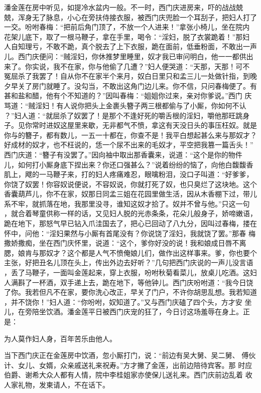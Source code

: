 潘金莲在房中听见，如提冷水盆内一般。不一时，西门庆进房来，吓的战战兢
兢，浑身无了脉息，小心在旁扶侍接衣服，被西门庆兜脸一个耳刮子，把妇人打了
一交。吩咐春梅：“把前后角门顶了，不放一个人进来！”拿张小椅儿，坐在院内
花架儿底下，取了一根马鞭子，拿在手里，喝令：“淫妇，脱了衣裳跪着！”那妇
人自知理亏，不敢不跪，真个脱去了上下衣服，跪在面前，低垂粉面，不敢出一声
儿。西门庆便问：“贼淫妇，你休推梦里睡里，奴才我已审问明白，他一一都供出
来了。你实说，我不在家，你与他偷了几遭？”妇人便哭道：“天那，天那！可不
冤屈杀了我罢了！自从你不在家半个来月，奴白日里只和孟三儿一处做针指，到晚
夕早关了房门就睡了。没勾当，不敢出这角门边儿来。你不信，只问春梅便了。有
甚和盐和醋，他有个不知道的？”因叫春梅：“姐姐你过来，亲对你爹说。”西门
庆骂道：“贼淫妇！有人说你把头上金裹头簪子两三根都偷与了小厮，你如何不认
？”妇人道：“就屈杀了奴罢了！是那个不逢好死的嚼舌根的淫妇，嚼他那旺跳身
子。见你常时进奴这屋里来歇，无非都气不愤，拿这有天没日头的事压枉奴。就是
你与的簪子，都有数儿，一五一十都在，你查不是！我平白想起甚么来与那奴才？
好成材的奴才，也不枉说的，恁一个尿不出来的毛奴才，平空把我篡一篇舌头！”
西门庆道：“簪子有没罢了。”因向袖中取出那香囊来，说道：“这个是你的物件
儿，如何打小厮身底下捏出来？你还口强甚么？”说着纷纷的恼了，向他白馥馥香
肌上，飕的一马鞭子来，打的妇人疼痛难忍，眼噙粉泪，没口子叫道：“好爹爹，
你饶了奴罢！你容奴说便说，不容奴说，你就打死了奴，也只臭烂了这块地。这个
香囊葫芦儿，你不在家，奴那日同孟三姐在花园里做生活，因从木香棚下过，带儿
系不牢，就抓落在地，我那里没寻，谁知这奴才拾了。奴并不曾与他。”只这一句
，就合着琴童供称一样的话，又见妇人脱的光赤条条，花朵儿般身子，娇啼嫩语，
跪在地下，那怒气早已钻入爪洼国去了，把心已回动了八九分，因叫过春梅，搂在
怀中，问他：“淫妇果然与小厮有首尾没有？你说饶了淫妇，我就饶了罢。”那春
梅撒娇撒痴，坐在西门庆怀里，说道：“这个，爹你好没的说！我和娘成日唇不离
腮，娘肯与那奴才？这个都是人气不愤俺娘儿们，做作出这样事来。爹，你也要个
主张，好把丑名儿顶在头上，传出外边去好听？”几句把西门庆说的一声儿没言语
，丢了马鞭子，一面叫金莲起来，穿上衣服，吩咐秋菊看菜儿，放桌儿吃酒。这妇
人满斟了一杯酒，双手递上去，跪在地下，等他钟儿。西门庆吩咐道：“我今日饶
了你。我若但凡不在家，要你洗心改正，早关了门户，不许你胡思乱想。我若知道
，并不饶你！”妇人道：“你吩咐，奴知道了。”又与西门庆磕了四个头，方才安
坐儿，在旁陪坐饮酒。潘金莲平日被西门庆宠的狂了，今日讨这场羞辱在身上。正
是：

为人莫作妇人身，百年苦乐由他人。

当下西门庆正在金莲房中饮酒，忽小厮打门，说：“前边有吴大舅、吴二舅、
傅伙计、女儿、女婿，众亲戚送礼来祝寿。”方才撇了金莲，出前边陪待宾客。那
时应伯爵、谢希大众人都有人情，院中李桂姐家亦使保儿送礼来。西门庆前边乱着
收人家礼物，发柬请人，不在话下。

